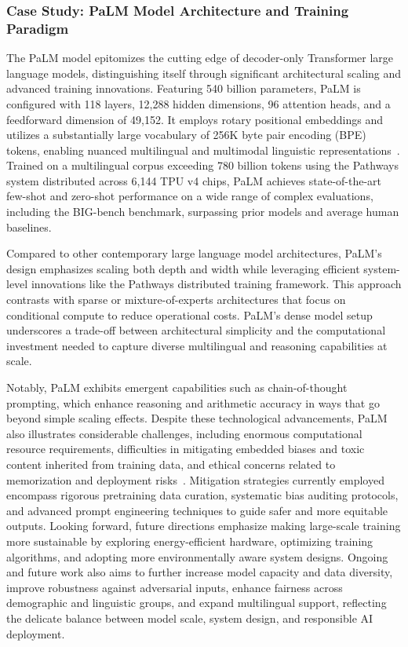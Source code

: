 \documentclass[sigconf]{acmart}
\begin{document}
\subsubsection{Case Study: PaLM Model Architecture and Training Paradigm}

The PaLM model epitomizes the cutting edge of decoder-only Transformer large language models, distinguishing itself through significant architectural scaling and advanced training innovations. Featuring 540 billion parameters, PaLM is configured with 118 layers, 12,288 hidden dimensions, 96 attention heads, and a feedforward dimension of 49,152. It employs rotary positional embeddings and utilizes a substantially large vocabulary of 256K byte pair encoding (BPE) tokens, enabling nuanced multilingual and multimodal linguistic representations~\cite{ref7}. Trained on a multilingual corpus exceeding 780 billion tokens using the Pathways system distributed across 6,144 TPU v4 chips, PaLM achieves state-of-the-art few-shot and zero-shot performance on a wide range of complex evaluations, including the BIG-bench benchmark, surpassing prior models and average human baselines.

Compared to other contemporary large language model architectures, PaLM’s design emphasizes scaling both depth and width while leveraging efficient system-level innovations like the Pathways distributed training framework. This approach contrasts with sparse or mixture-of-experts architectures that focus on conditional compute to reduce operational costs. PaLM’s dense model setup underscores a trade-off between architectural simplicity and the computational investment needed to capture diverse multilingual and reasoning capabilities at scale.

Notably, PaLM exhibits emergent capabilities such as chain-of-thought prompting, which enhance reasoning and arithmetic accuracy in ways that go beyond simple scaling effects. Despite these technological advancements, PaLM also illustrates considerable challenges, including enormous computational resource requirements, difficulties in mitigating embedded biases and toxic content inherited from training data, and ethical concerns related to memorization and deployment risks~\cite{ref7}. Mitigation strategies currently employed encompass rigorous pretraining data curation, systematic bias auditing protocols, and advanced prompt engineering techniques to guide safer and more equitable outputs. Looking forward, future directions emphasize making large-scale training more sustainable by exploring energy-efficient hardware, optimizing training algorithms, and adopting more environmentally aware system designs. Ongoing and future work also aims to further increase model capacity and data diversity, improve robustness against adversarial inputs, enhance fairness across demographic and linguistic groups, and expand multilingual support, reflecting the delicate balance between model scale, system design, and responsible AI deployment.
\end{document}
